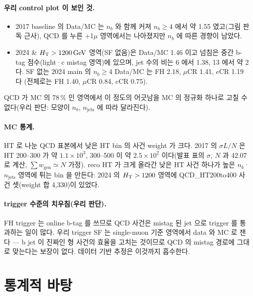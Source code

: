 \paragraph{우리 control plot 이 보인 것.}
\begin{itemize}
\item 2017 baseline 의 Data/MC 는 $n_b$ 와 함께 커져 $n_b\ge4$ 에서 약 1.55 였고(그림 판독 근사), QCD 를 누른 +1$\mu$ 영역에서는 나아졌지만 $n_b$ 에
      따른 경향이 남았다.
\item 2024  \& $H_{\mathrm{T}}>1200\,\mathrm{GeV}$ 영역(SF 없음)은 Data/MC 1.46 이고 넘침은 중간 b-tag 점수(light·c mistag 영역)에 있으며, jet 수의
      비는 6 에서 1.38, 13 에서 약 2 다. SF 없는 2024 main 의 $n_b\ge4$ Data/MC 는 FH 2.18, $\mu$CR 1.41, $e$CR 1.19 다
(전체로는 FH 1.40, $\mu$CR 0.84, $e$CR 0.75).
\end{itemize}
QCD 가 MC 의 78\,\% 인 영역에서 이 정도의 어긋남을 MC 의 정규화 하나로 고칠 수 없다(우리 판단: 모양이 $n_b$,
$n_{\text{jets}}$ 에 따라 달라진다).

\paragraph{MC 통계.}
HT 로 나눈 QCD 표본에서 낮은 HT bin 의 사건 weight 가 크다. 2017 의 $\sigma L/N$ 은 HT 200–300\GeV{} 가 약 $1.1\times10^3$, 300–500 이 약
$2.5\times10^2$ 이다(발표 표의 $\sigma$, $N$ 과 42.07\fbinv{} 로 계산, $\sum w_{\text{gen}}\simeq N$ 가정). reco HT 가 크게 올라간
낮은 HT 사건 하나가 높은 $n_b$·$n_{\text{jets}}$ 영역에 튀는 bin 을 만든다: 2024 의 $H_{\mathrm{T}}>1200$ 영역에 QCD\_HT200to400 사건 셋(weight 합 4,330)이
있었다.

\paragraph{trigger 수준의 치우침(우리 판단).}
FH trigger 는 online b-tag 를 쓰므로 QCD 사건은 mistag 된 jet 으로 trigger 를 통과하는 일이 많다. 우리 trigger SF 는 single-muon 기준 영역에서
data 와 \ttbar{} MC 로 잰다 — b jet 이 진짜인 \ttbar{} 형 사건의 효율을 고치는 것이므로 QCD 의 mistag 경로에 그대로
맞는다는 보장이 없다. 데이터 기반 추정은 이것까지 흡수한다.

\section{통계적 바탕}\label{sec:qcd-stats}

